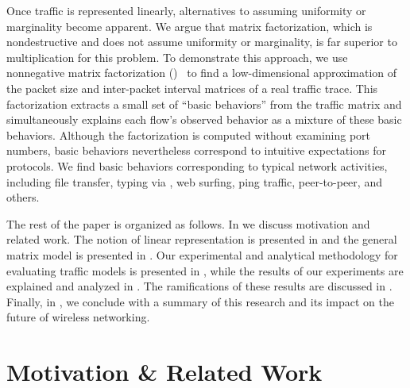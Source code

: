 \documentclass[twocolumn,final]{svjour3}
\begin{document}


Once traffic is represented linearly, alternatives to assuming uniformity or marginality become apparent.
We argue that matrix factorization, which is nondestructive and does not assume uniformity or marginality, is far superior to multiplication for this problem.
To demonstrate this approach, we use nonnegative matrix factorization ()~\cite{Lee01} to find a low-dimensional approximation of the packet size and inter-packet interval matrices of a real traffic trace.
This factorization extracts a small set of ``basic behaviors'' from the traffic matrix and simultaneously explains each flow's observed behavior as a mixture of these basic behaviors.
Although the factorization is computed without examining port numbers, basic behaviors nevertheless correspond to intuitive expectations for protocols.
We find basic behaviors corresponding to typical network activities, including file transfer, typing via , web surfing, ping traffic, peer-to-peer, and others.

The rest of the paper is organized as follows.
In  we discuss motivation and related work.
The notion of linear representation is presented in  and the general matrix model is presented in .
Our experimental and analytical methodology for evaluating traffic models is presented in , while the results of our experiments are explained and analyzed in .
The ramifications of these results are discussed in .
Finally, in , we conclude with a summary of this research and its impact on the future of wireless networking.

\section{Motivation \& Related Work}
\label{sec:related-work}
\label{sec:motivation}

\end{document}

